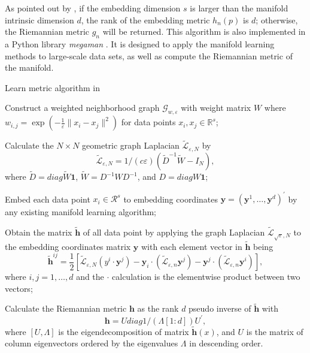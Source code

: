 \documentclass[11pt,a4paper,]{article}
\begin{document}
As pointed out by \textcite{Perrault-Joncas2013-pq}, if the embedding dimension \(s\) is larger than the manifold intrinsic dimension \(d\), the rank of the embedding metric \(h_n(p)\) is \(d\); otherwise, the Riemannian metric \(g_n\) will be returned.
This algorithm is also implemented in a Python library \emph{megaman} \autocite{McQueen2016-xz}. It is designed to apply the manifold learning methods to large-scale data sets, as well as compute the Riemannian metric of the manifold.

\begin{algorithm}[!htb]
  \caption{Learn metric algorithm in \cite{Perrault-Joncas2013-pq} }
  \label{alg:learnmetric}
  \DontPrintSemicolon
  \SetAlgoLined
  \BlankLine
  \begin{algorithmic}[1]

  \STATE Construct a weighted neighborhood graph $\mathcal{G}_{w,\varepsilon}$ with weight matrix $W$ where $w_{i,j}=\exp(-\frac{1}{\varepsilon}\|x_i-x_j\|^2)$ for data points $x_i,x_j \in \mathbb{R}^s$;

  \STATE Calculate the $N\times N$ geometric graph Laplacian $\widetilde{\mathcal{L}}_{\varepsilon,N}$ by
  $$
  \widetilde{\mathcal{L}}_{\varepsilon,N} = 1/(c\varepsilon)(\widetilde{D}^{-1} \widetilde{W} - I_N),
  $$
  where $\widetilde{D}=diag{\widetilde{W}\pmb{1}}$, $\widetilde{W} = D^{-1}WD^{-1}$, and $D = diag{W\pmb{1}}$;

  \STATE Embed each data point $x_i\in \mathcal{R}^s$ to embedding coordinates $\pmb{y}=(\pmb{y}^1,\dots,\pmb{y}^d)^\prime$ by any existing manifold learning algorithm;

  \STATE Obtain the matrix $\pmb{\tilde{h}}$ of all data point by applying the graph Laplacian $\widetilde{\mathcal{L}}_{\sqrt{\varepsilon},N}$ to the embedding coordinates matrix $\pmb{y}$ with each element vector in $\pmb{\tilde{h}}$ being
  $$
    \pmb{\tilde{h}}^{i j} = \frac{1}{2} \left[\tilde{\mathcal{L}}_{\varepsilon, N}\left(y^i \cdot \pmb{y}^j\right) - \pmb{y}_i \cdot\left(\tilde{\mathcal{L}}_{\varepsilon, n} \pmb{y}^j\right) - \pmb{y}^j \cdot\left(\tilde{\mathcal{L}}_{\varepsilon, n} \pmb{y}^i\right)\right],
  $$
  where $i,j=1,\dots,d$ and the $\cdot$ calculation is the elementwise product between two vectors; 

  \STATE Calculate the Riemannian metric $\pmb{h}$ as the rank $d$ pseudo inverse of $\tilde{\pmb{    h}}$ with 
  $$
    \pmb{h} = U diag{1/(\Lambda[1:d])} U^\prime,
  $$
  where $[U, \Lambda]$ is the eigendecomposition of matrix $\pmb{\tilde{h}}(x)$, and $U$ is the matrix of column eigenvectors ordered by the eigenvalues $\Lambda$ in descending order.

  \end{algorithmic}
\end{algorithm}
\end{document}
